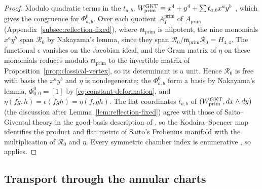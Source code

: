 \begin{proof}
Modulo quadratic terms in the $t_{a,b}$,
$W^{\mathrm{GKT}}_{\mathrm{prim}}\equiv x^4+y^4+\sum t_{a,b}x^ay^b$
\cite[Def.~3.47(1) and (4.11)]{grossetal2022open}, which gives the
congruence for $\Phi^0_{a,b}$.  Over each quotient $A^{\mathrm{prim}}_I$ of
$A_{\mathrm{prim}}$ (Appendix~\ref{subsec:reflection-fixed}), where $\mathfrak m_{\mathrm{prim}}$ is nilpotent, the nine monomials $x^ay^b$
span $\mathcal R_0$ by Nakayama's lemma, since they span
$\mathcal R_0/\mathfrak m_{\mathrm{prim}}\mathcal R_0=H_{4,4}$.  The
functional $\epsilon$ vanishes on the Jacobian ideal, and the Gram matrix of
$\eta$ on these monomials reduces modulo $\mathfrak m_{\mathrm{prim}}$ to the
invertible matrix of Proposition~\ref{prop:classical-vertex}, so its
determinant is a unit.  Hence $\mathcal R_0$ is free with basis the
$x^ay^b$ and $\eta$ is nondegenerate; the $\Phi^0_{a,b}$ form a basis by
Nakayama's lemma, $\Phi^0_{0,0}=[1]$ by \eqref{eq:constant-deformation}, and
$\eta(fg,h)=\epsilon(fgh)=\eta(f,gh)$.  The flat coordinates $t_{a,b}$ of
$(W^{\mathrm{GKT}}_{\mathrm{prim}},dx\wedge dy)$ (the discussion after
Lemma~\ref{lem:reflection-fixed}) agree with those of Saito--Givental theory
in the good-basis description of \cite[\S2.2]{heetal2022}
\cite[Rems.~0.4(2) and~4.5]{grossetal2022open}, so the Kodaira--Spencer map
identifies the product and flat metric of Saito's Frobenius manifold
\cite{saito1983period} with the multiplication of $\mathcal R_0$ and $\eta$.
Every symmetric chamber index is enumerative
\cite[Prop.~3.46 and Cor.~5.14]{grossetal2022open}, so
\cite[Thm.~0.3 and Rem.~0.4(2)]{grossetal2022open} applies.
\end{proof}

\subsection{Transport through the annular charts}
\label{subsec:KS-classes}

